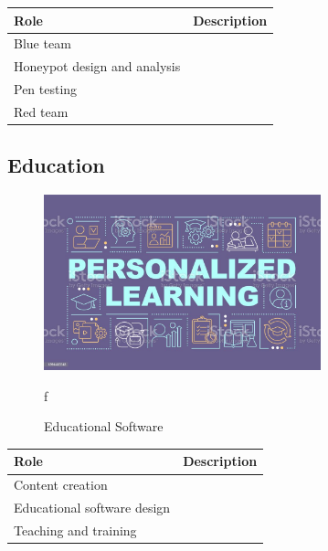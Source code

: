 \begin{table}[H]
	\begin{center}
		\begin{tabular}{p{1.3in}|p{3in}} 
			\textbf{Role} & \textbf{Description}\\
			\hline
			Blue team & \\
			\hline
			Honeypot design and analysis & \\
			\hline
			Pen testing & \\
			\hline
			Red team & \\
		\end{tabular}
	\end{center}
\end{table}


\subsection{Education}

\begin{figure}[H]
	\begin{center}
		\caption{Educational Software}
		\vskip 4pt
		\includegraphics[height=2in]{images/careers/istockphoto-1394432243-1024x1024.jpg}
	\end{center}f
\end{figure}

\begin{table}[H]
	\begin{center}
		\begin{tabular}{p{1.3in}|p{3in}} 
			\textbf{Role} & \textbf{Description}\\
			\hline
			Content creation & \\
			\hline
			Educational software design & \\
			\hline
			Teaching and training & \\
		\end{tabular}
	\end{center}
\end{table}

